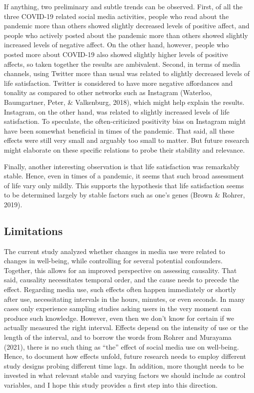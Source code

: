 \documentclass[
  english,
  man,mask,floatsintext]{apa6}
\begin{document}
If anything, two preliminary and subtle trends can be observed.
First, of all the three COVID-19 related social media activities, people who read about the pandemic more than others showed slightly decreased levels of positive affect, and people who actively posted about the pandemic more than others showed slightly increased levels of negative affect.
On the other hand, however, people who posted more about COVID-19 also showed slightly higher levels of positive affects, so taken together the results are ambivalent.
Second, in terms of media channels, using Twitter more than usual was related to slightly decreased levels of life satisfaction.
Twitter is considered to have more negative affordances and tonality as compared to other networks such as Instagram (Waterloo, Baumgartner, Peter, \& Valkenburg, 2018), which might help explain the results.
Instagram, on the other hand, was related to slightly increased levels of life satisfaction.
To speculate, the often-criticized positivity bias on Instagram might have been somewhat beneficial in times of the pandemic.
That said, all these effects were still very small and arguably too small to matter.
But future research might elaborate on these specific relations to probe their stability and relevance.

Finally, another interesting observation is that life satisfaction was remarkably stable.
Hence, even in times of a pandemic, it seems that such broad assessment of life vary only mildly.
This supports the hypothesis that life satisfaction seems to be determined largely by stable factors such as one's genes (Brown \& Rohrer, 2019).

\hypertarget{limitations}{%
\subsection{Limitations}\label{limitations}}

The current study analyzed whether changes in media use were related to changes in well-being, while controlling for several potential confounders.
Together, this allows for an improved perspective on assessing causality.
That said, causality necessitates temporal order, and the cause needs to precede the effect.
Regarding media use, such effects often happen immediately or shortly after use, necessitating intervals in the hours, minutes, or even seconds.
In many cases only experience sampling studies asking users in the very moment can produce such knowledge.
However, even then we don't know for certain if we actually measured the right interval.
Effects depend on the intensity of use or the length of the interval, and to borrow the words from Rohrer and Murayama (2021), there is no such thing as ``the'' effect of social media use on well-being.
Hence, to document how effects unfold, future research needs to employ different study designs probing different time lags.
In addition, more thought needs to be invested in what relevant stable and varying factors we should include as control variables, and I hope this study provides a first step into this direction.
\end{document}
